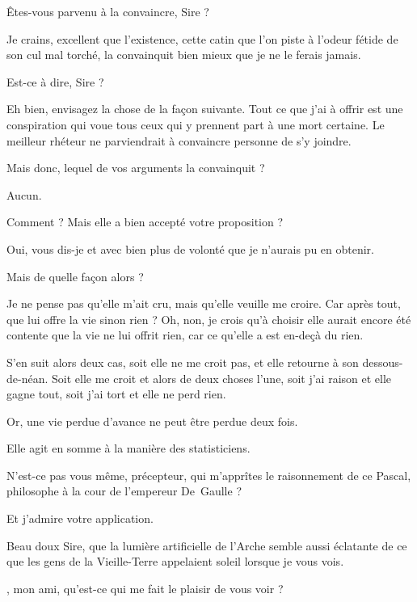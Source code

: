 \begin{drama}
  \alexasspeaks Êtes-vous parvenu à la convaincre, Sire ?

  \elenaspeaks Je crains, excellent \alexas que l’existence, cette catin que l’on piste à l’odeur fétide de son cul mal torché, la convainquit bien mieux que je ne le ferais jamais.

  \alexasspeaks Est-ce à dire, Sire ?

  \elenaspeaks Eh bien, envisagez la chose de la façon suivante. Tout ce que j’ai à offrir est une conspiration qui voue tous ceux qui y prennent part à une mort certaine. Le meilleur rhéteur ne parviendrait à convaincre personne de s’y joindre. 

  \alexasspeaks Mais donc, lequel de vos arguments la convainquit ?

  \elenaspeaks Aucun.

  \alexasspeaks Comment ? Mais elle a bien accepté votre proposition ?

  \elenaspeaks Oui, vous dis-je et avec bien plus de volonté que je n’aurais pu en obtenir.

  \alexasspeaks Mais de quelle façon alors ?

  \elenaspeaks Je ne pense pas qu’elle m’ait cru, mais qu’elle veuille me croire. Car après tout, que lui offre la vie sinon rien ? Oh, non, je crois qu’à choisir elle aurait encore été contente que la vie ne lui offrit rien, car ce qu’elle a est en-deçà du rien. 

  \alexasspeaks S’en suit alors deux cas, soit elle ne me croit pas, et elle retourne à son dessous-de-néan. Soit elle me croit et alors de deux choses l’une, soit j’ai raison et elle gagne tout, soit j’ai tort et elle ne perd rien.

  \alexasspeaks Or, une vie perdue d’avance ne peut être perdue deux fois.

  \alexasspeaks Elle agit en somme à la manière des statisticiens.

  \elenaspeaks N’est-ce pas vous même, précepteur, qui m’apprîtes le raisonnement de ce Pascal, philosophe à la cour de l’empereur De~Gaulle ?

  \alexasspeaks Et j’admire votre application.

  \intrat{\general}

  \generalspeaks Beau doux Sire, que la lumière artificielle de l’Arche semble aussi éclatante de ce que les gens de la Vieille-Terre appelaient soleil lorsque je vous vois.

  \elenaspeaks \general, mon ami, qu’est-ce qui me fait le plaisir de vous voir ?


\end{drama}
